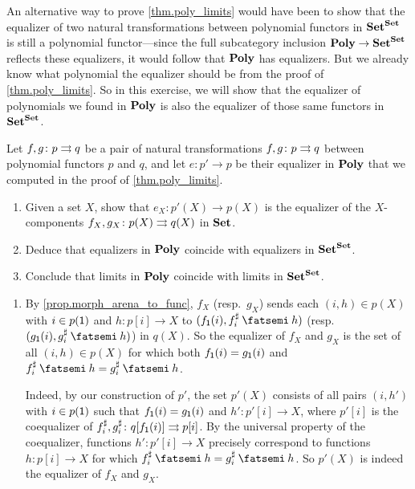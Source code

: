 \documentclass[Book-Poly]{subfiles}
\begin{document}
\begin{exercise} \label{exc.refl_limits}
An alternative way to prove \cref{thm.poly_limits} would have been to show that the equalizer of two natural transformations between polynomial functors in $\mathbf{Set}^{\mathbf{Set}}$ is still a polynomial functor---since the full subcategory inclusion $\mathbf{Poly} \to \mathbf{Set}^{\mathbf{Set}}$ reflects these equalizers, it would follow that $\mathbf{Poly}$ has equalizers.
But we already know what polynomial the equalizer should be from the proof of \cref{thm.poly_limits}.
So in this exercise, we will show that the equalizer of polynomials we found in $\mathbf{Poly}$ is also the equalizer of those same functors in $\mathbf{Set}^{\mathbf{Set}}$.

Let $f,g\colon p\rightrightarrows q$ be a pair of natural transformations $f,g\colon p\rightrightarrows q$ between polynomial functors $p$ and $q$, and let $e\colon p'\to p$ be their equalizer in $\mathbf{Poly}$ that we computed in the proof of \cref{thm.poly_limits}.
\begin{enumerate}
    \item Given a set $X$, show that $e_X\colon p'(X)\to p(X)$ is the equalizer of the $X$-components $f_X,g_X\colon p(X)\rightrightarrows q(X)$ in $\mathbf{Set}$.
    \item Deduce that equalizers in $\mathbf{Poly}$ coincide with equalizers in $\mathbf{Set}^{\mathbf{Set}}$.
    \item Conclude that limits in $\mathbf{Poly}$ coincide with limits in $\mathbf{Set}^{\mathbf{Set}}$. \qedhere
\end{enumerate}
\begin{solution}
\begin{enumerate}
    \item By \cref{prop.morph_arena_to_func}, $f_X$ (resp.\ $g_X$) sends each $(i,h)\in p(X)$ with $i\in p(\textsf{1})$ and $h\colon p[i]\to X$ to $(f_\1(i), f^\sharp_i\then h)$ (resp.\ $(g_\1(i), g^\sharp_i\then h)$) in $q(X)$.
    So the equalizer of $f_X$ and $g_X$ is the set of all $(i,h)\in p(X)$ for which both $f_{\textsf{1}}(i) = g_{\textsf{1}}(i)$ and $f^\sharp_i\then h = g^\sharp_i\then h$.

    Indeed, by our construction of $p'$, the set $p'(X)$ consists of all pairs $(i,h')$ with $i\in p(\textsf{1})$ such that $f_{\textsf{1}}(i) = g_{\textsf{1}}(i)$ and $h'\colon p'[i]\to X$, where $p'[i]$ is the coequalizer of $f^\sharp_i,g^\sharp_i\colon q[f_{\textsf{1}}(i)]\rightrightarrows p[i]$.
    By the universal property of the coequalizer, functions $h'\colon p'[i]\to X$ precisely correspond to functions $h\colon p[i]\to X$ for which $f^\sharp_i\then h = g^\sharp_i\then h$.
    So $p'(X)$ is indeed the equalizer of $f_X$ and $g_X$.


\end{enumerate}
\end{solution}
\end{exercise}
\end{document}
